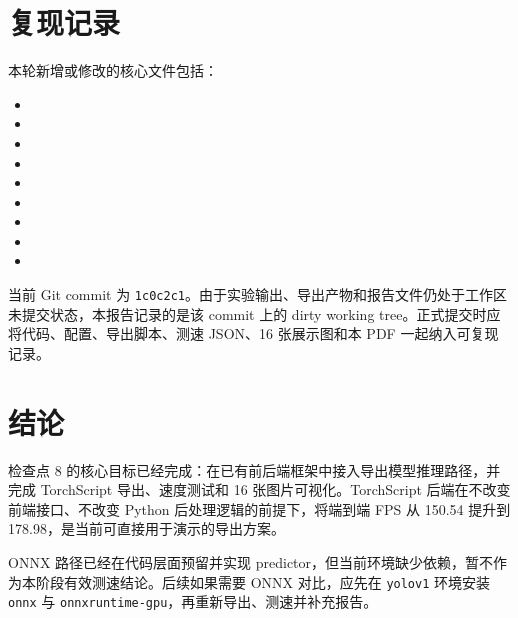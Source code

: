 \documentclass[11pt,a4paper]{article}
\begin{document}
\section{复现记录}

本轮新增或修改的核心文件包括：

\begin{itemize}[leftmargin=2em]
  \item {}
  \item {}
  \item {}
  \item {}
  \item {}
  \item {}
  \item {}
  \item {}
  \item {}
\end{itemize}

当前 Git commit 为 \texttt{1c0c2c1}。由于实验输出、导出产物和报告文件仍处于工作区未提交状态，本报告记录的是该 commit 上的 dirty working tree。正式提交时应将代码、配置、导出脚本、测速 JSON、16 张展示图和本 PDF 一起纳入可复现记录。

\section{结论}

检查点 8 的核心目标已经完成：在已有前后端框架中接入导出模型推理路径，并完成 TorchScript 导出、速度测试和 16 张图片可视化。TorchScript 后端在不改变前端接口、不改变 Python 后处理逻辑的前提下，将端到端 FPS 从 150.54 提升到 178.98，是当前可直接用于演示的导出方案。

ONNX 路径已经在代码层面预留并实现 predictor，但当前环境缺少依赖，暂不作为本阶段有效测速结论。后续如果需要 ONNX 对比，应先在 \texttt{yolov1} 环境安装 \texttt{onnx} 与 \texttt{onnxruntime-gpu}，再重新导出、测速并补充报告。
\end{document}
